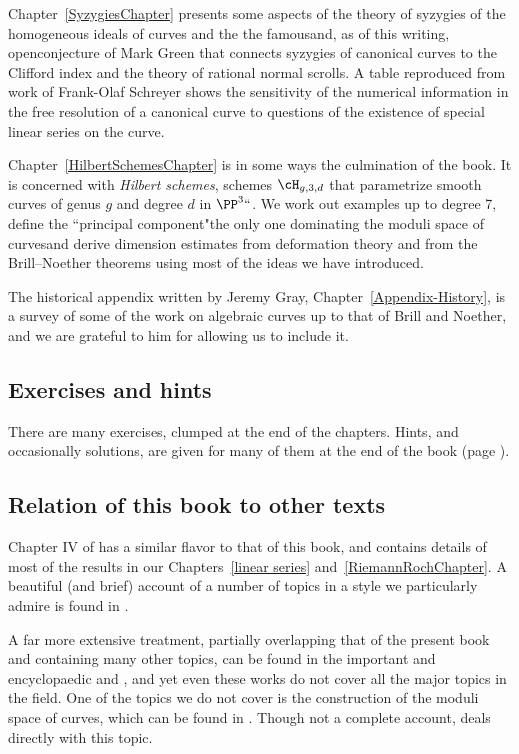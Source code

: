 Chapter~\ref{SyzygiesChapter} presents some aspects of the theory of syzygies of the homogeneous ideals of curves and the the famous\emdash and, as of this writing, open\emdash conjecture of Mark Green that connects syzygies of canonical curves to the Clifford index and the theory of rational normal scrolls. A table reproduced from work of Frank-Olaf Schreyer shows the sensitivity of the numerical information in the free resolution of a canonical curve to questions of the existence of special linear series on the curve.

Chapter~\ref{HilbertSchemesChapter} is in some ways the culmination of the book. It is concerned with \emph{Hilbert schemes}, schemes $\cH_{g,3,d}$ that parametrize smooth curves of genus $g$ and degree $d$  in $\PP^3` `$. We work out examples up to degree 7, define the ``principal component"\emdash the only one dominating the moduli space of curves\emdash and derive dimension estimates from deformation theory and from the Brill--Noether theorems
using most of the ideas we have introduced. 

The historical appendix written by Jeremy Gray, Chapter~\ref{Appendix-History},  is a survey of some of the work on
algebraic curves up to that of Brill and Noether, and we are grateful to him for allowing us to include it.

\subsection*{Exercises and hints}

There are many exercises, clumped at the end of the chapters. Hints,
and occasionally solutions, are given for many of them at the end of
the book (page \pageref{hints}).

\subsection*{Relation of this book to other texts} 
Chapter IV of \cite{Hartshorne1977} has a similar flavor to that of this book, and contains details of most of the 
results in our Chapters~\ref{linear series} and~\ref{RiemannRochChapter}. A beautiful (and brief) account of a number of topics in a style we particularly admire is found in \cite{MumfordCJ}.

A far more extensive treatment, partially overlapping that of the present book and containing many other topics, can be found in the important and encyclopaedic \cite{ACGH} and \cite{ACG}, and yet even these works do not cover all the major topics in the field. 
One of the topics we do not cover is the construction of the moduli space of curves, which can be found
in \cite{ACG}. Though not a complete account, \cite{HarrisMorrison1998} deals directly with this
topic. 

